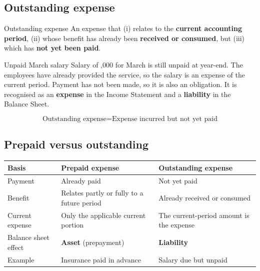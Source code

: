 \documentclass[11pt,a4paper]{article}
\newcommand{\Rs}{\ifmmode\text{\rsfont ₹}\else{\rsfont ₹}\fi}
\begin{document}
\begin{center}
\end{center}

\subsection{Outstanding expense}

\begin{defbox}{Outstanding expense}
An expense that (i) relates to the \textbf{current accounting period}, (ii) whose benefit has already been
\textbf{received or consumed}, but (iii) which has \textbf{not yet been paid}.
\end{defbox}

\begin{exbox}{Unpaid March salary}
Salary of \Rs 50,000 for March is still unpaid at year-end. The employees have already provided the service, so
the salary is an expense of the current period. Payment has not been made, so it is also an obligation.
It is recognised as an \textbf{expense} in the Income Statement and a \textbf{liability} in the Balance Sheet.
\end{exbox}

\[
\boxed{\text{Outstanding expense}=\text{Expense incurred but not yet paid}}
\]

\subsection{Prepaid versus outstanding}

\begin{center}
\small
\begin{tabularx}{\textwidth}{@{}l Y Y@{}}
\toprule
{}\textbf{Basis} & \textbf{Prepaid expense} & \textbf{Outstanding expense}\\
\midrule
Payment & Already paid & Not yet paid\\
Benefit & Relates partly or fully to a future period & Already received or consumed\\
Current expense & Only the applicable current portion & The current-period amount is the expense\\
Balance sheet effect & \textbf{Asset} (prepayment) & \textbf{Liability}\\
Example & Insurance paid in advance & Salary due but unpaid\\
\bottomrule
\end{tabularx}
\end{center}
\end{document}

